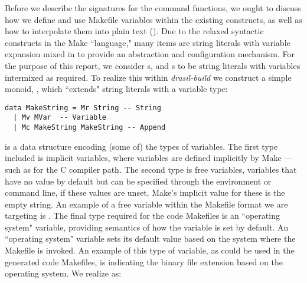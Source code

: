 {{{{{Before we describe the signatures for the command functions, we ought to discuss how we define and use Makefile variables within the existing constructs, as well as how to interpolate them into plain text (). Due to the relaxed syntactic constructs in the Make ``language," many items are string literals with variable expansion mixed in to provide an abstraction and configuration mechanism. For the purpose of this report, we consider s,  and s to be string literals with variables intermixed as required. To realize this within \textit{drasil-build} we construct a simple monoid, , which ``extends" string literals with a variable type:

\begin{tcolorbox}
\begin{verbatim}
data MakeString = Mr String -- String
  | Mv MVar  -- Variable
  | Mc MakeString MakeString -- Append
\end{verbatim}
\end{tcolorbox}

% 

 is a data structure encoding (some of) the types of variables. The first type included is implicit variables, where variables are defined implicitly by Make --- such as  for the C compiler path. The second type is free variables, variables that have no value by default but can be specified through the environment or command line, if these values are unset, Make's implicit value for these is the empty string. An example of a free variable within the Makefile format we are targeting is . The final type required for the code Makefiles is an ``operating system" variable, providing semantics of how the variable is set by default. An ``operating system" variable sets its default value based on the system where the Makefile is invoked. An example of this type of variable, as could be used in the generated code Makefiles, is indicating the binary file extension based on the operating system. We realize  as:

}}}}}
